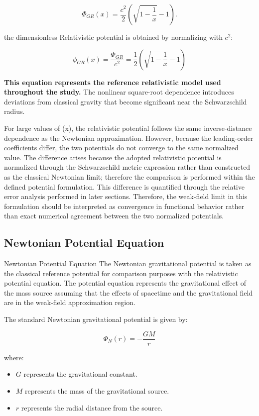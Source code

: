 \documentclass[
]{article}
\begin{document}
\[
\Phi_{GR}(x)=
\frac{c^2}{2}\left(\sqrt{1-\frac{1}{x}}-1\right).
\]

the dimensionless Relativistic potential is obtained by normalizing with
$c^2$:

\[
\phi_{GR}(x)
=
\frac{\Phi_{GR}}{c^2}
=
\frac{1}{2}
\left(
\sqrt{1-\frac{1}{x}}
-1
\right)
\]

\textbf{This equation represents the reference relativistic model used
throughout the study.} The nonlinear square-root dependence introduces
deviations from classical gravity that become significant near the
Schwarzschild radius.

For large values of (x), the relativistic potential follows the same
inverse-distance dependence as the Newtonian approximation. However,
because the leading-order coefficients differ, the two potentials do not
converge to the same normalized value. The difference arises because the adopted relativistic potential is normalized through the Schwarzschild metric expression rather than constructed as the classical Newtonian limit; therefore the comparison is performed within the defined potential formulation. This difference is quantified
through the relative error analysis performed in later
sections. Therefore, the weak-field limit in this formulation should be
interpreted as convergence in functional behavior rather than exact
numerical agreement between the two normalized potentials.

\subsection{Newtonian Potential Equation}\label{newtonian-potential-equation}

Newtonian Potential Equation The Newtonian gravitational potential is
taken as the classical reference potential for comparison purposes with
the relativistic potential equation. The potential equation represents
the gravitational effect of the mass source assuming that the effects of
spacetime and the gravitational field are in the weak-field
approximation region.

The standard Newtonian gravitational potential is given by:

\[\Phi_N(r)=-\frac{GM}{r}\]

where:
\begin{itemize}
\item $G$ represents the gravitational constant.
\item $M$ represents the mass of the gravitational source.
\item $r$ represents the radial distance from the source.
\end{itemize}
\end{document}
